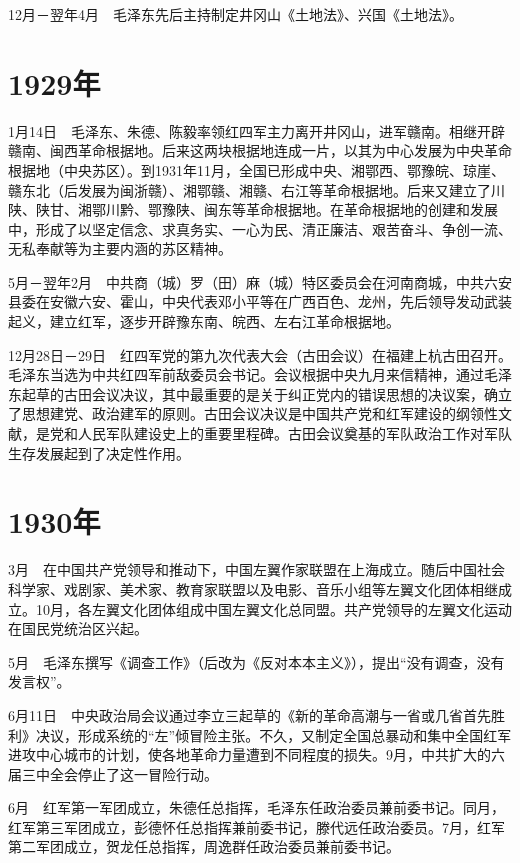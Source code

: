 \documentclass[10pt,a4paper,twocolumn]{book}
\begin{document}
12月－翌年4月　毛泽东先后主持制定井冈山《土地法》、兴国《土地法》。

\section{1929年}

1月14日　毛泽东、朱德、陈毅率领红四军主力离开井冈山，进军赣南。相继开辟赣南、闽西革命根据地。后来这两块根据地连成一片，以其为中心发展为中央革命根据地（中央苏区）。到1931年11月，全国已形成中央、湘鄂西、鄂豫皖、琼崖、赣东北（后发展为闽浙赣）、湘鄂赣、湘赣、右江等革命根据地。后来又建立了川陕、陕甘、湘鄂川黔、鄂豫陕、闽东等革命根据地。在革命根据地的创建和发展中，形成了以坚定信念、求真务实、一心为民、清正廉洁、艰苦奋斗、争创一流、无私奉献等为主要内涵的苏区精神。

5月－翌年2月　中共商（城）罗（田）麻（城）特区委员会在河南商城，中共六安县委在安徽六安、霍山，中央代表邓小平等在广西百色、龙州，先后领导发动武装起义，建立红军，逐步开辟豫东南、皖西、左右江革命根据地。

12月28日－29日　红四军党的第九次代表大会（古田会议）在福建上杭古田召开。毛泽东当选为中共红四军前敌委员会书记。会议根据中央九月来信精神，通过毛泽东起草的古田会议决议，其中最重要的是关于纠正党内的错误思想的决议案，确立了思想建党、政治建军的原则。古田会议决议是中国共产党和红军建设的纲领性文献，是党和人民军队建设史上的重要里程碑。古田会议奠基的军队政治工作对军队生存发展起到了决定性作用。

\section{1930年}

3月　在中国共产党领导和推动下，中国左翼作家联盟在上海成立。随后中国社会科学家、戏剧家、美术家、教育家联盟以及电影、音乐小组等左翼文化团体相继成立。10月，各左翼文化团体组成中国左翼文化总同盟。共产党领导的左翼文化运动在国民党统治区兴起。

5月　毛泽东撰写《调查工作》（后改为《反对本本主义》），提出“没有调查，没有发言权”。

6月11日　中央政治局会议通过李立三起草的《新的革命高潮与一省或几省首先胜利》决议，形成系统的“左”倾冒险主张。不久，又制定全国总暴动和集中全国红军进攻中心城市的计划，使各地革命力量遭到不同程度的损失。9月，中共扩大的六届三中全会停止了这一冒险行动。

6月　红军第一军团成立，朱德任总指挥，毛泽东任政治委员兼前委书记。同月，红军第三军团成立，彭德怀任总指挥兼前委书记，滕代远任政治委员。7月，红军第二军团成立，贺龙任总指挥，周逸群任政治委员兼前委书记。
\end{document}
